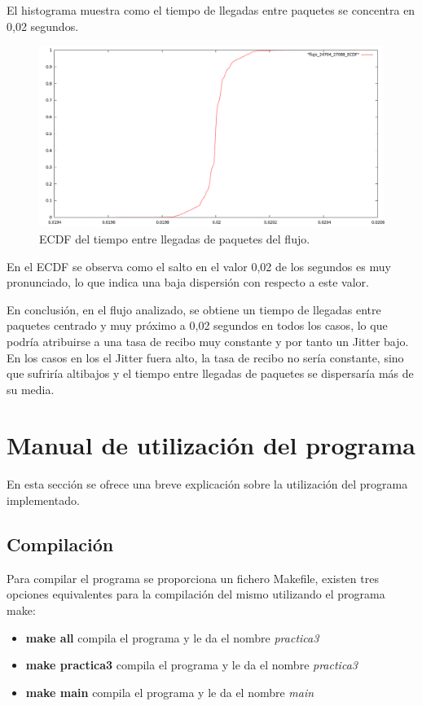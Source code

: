 \documentclass[a4paper, 11pt]{article}	%
\begin{document}
El histograma muestra como el tiempo de llegadas entre paquetes se concentra en 0,02 segundos.

\begin{figure}[H]
\centering
\includegraphics[width=1.0\textwidth]{flujo_ecdf.png}
\caption{ECDF del tiempo entre llegadas de paquetes del flujo.}
\label{fig:flujo_ecdf}
\end{figure}

En el ECDF se observa como el salto en el valor 0,02 de los segundos es muy pronunciado, lo que indica una baja dispersión con respecto a este valor.

En conclusión, en el flujo analizado, se obtiene un tiempo de llegadas entre paquetes centrado y muy próximo a 0,02 segundos en todos los casos, lo que podría atribuirse a una tasa de recibo muy constante y por tanto un Jitter bajo. En los casos en los el Jitter fuera alto, la tasa de recibo no sería constante, sino que sufriría altibajos y el tiempo entre llegadas de paquetes se dispersaría más de su media.

\clearpage
\appendix
\renewcommand\appendixname{Anexo}
\section{Manual de utilización del programa}
\label{sec:manual}
En esta sección se ofrece una breve explicación sobre la utilización del programa implementado.
\subsection{Compilación}
Para compilar el programa se proporciona un fichero Makefile, existen tres opciones equivalentes para la compilación del mismo utilizando el programa make:
\begin{itemize}
\item \textbf{make all} compila el programa y le da el nombre \textit{practica3}
\item \textbf{make practica3} compila el programa y le da el nombre \textit{practica3}
\item \textbf{make main} compila el programa y le da el nombre \textit{main}
\end{itemize}
\end{document}
